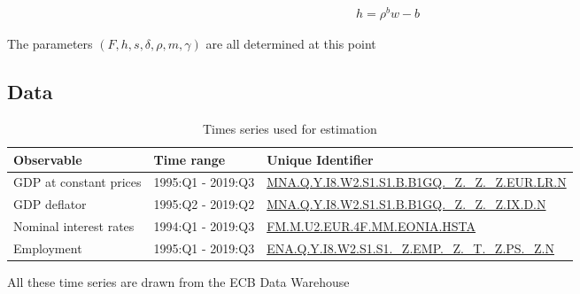 \begin{align*}
h = \rho^b w - b 
\end{align*}

The parameters $\left( F, h, s, \delta, \rho, m, \gamma \right)$ are all determined at this point

\subsection{Data}

\begin{table}[H]
\begin{center}
\begin{tabular}{lll}
\toprule
Observable & Time range & Unique Identifier\\
\midrule
GDP at constant prices & 1995:Q1 - 2019:Q3 & \href{https://sdw.ecb.europa.eu/browseTable.do?node=qview&SERIES_KEY=320.MNA.Q.Y.I8.W2.S1.S1.B.B1GQ._Z._Z._Z.EUR.LR.N&trans=N}{MNA.Q.Y.I8.W2.S1.S1.B.B1GQ.\_Z.\_Z.\_Z.EUR.LR.N}\\
GDP deflator & 1995:Q2 - 2019:Q2 & \href{https://sdw.ecb.europa.eu/quickview.do?SERIES_KEY=320.MNA.Q.Y.I8.W2.S1.S1.B.B1GQ._Z._Z._Z.IX.D.N}{MNA.Q.Y.I8.W2.S1.S1.B.B1GQ.\_Z.\_Z.\_Z.IX.D.N}\\
Nominal interest rates & 1994:Q1 - 2019:Q3 & \href{https://sdw.ecb.europa.eu/quickview.do?SERIES_KEY=143.FM.M.U2.EUR.4F.MM.EONIA.HSTA&start=&end=&submitOptions.x=0&submitOptions.y=0&trans=QF}{FM.M.U2.EUR.4F.MM.EONIA.HSTA}\\
Employment & 1995:Q1 - 2019:Q3 & \href{https://sdw.ecb.europa.eu/browseChart.do?node=qview&SERIES_KEY=390.ENA.Q.Y.I8.W2.S1.S1._Z.EMP._Z._T._Z.PS._Z.N}{ENA.Q.Y.I8.W2.S1.S1.\_Z.EMP.\_Z.\_T.\_Z.PS.\_Z.N}\\
\bottomrule
\end{tabular}
\label{est_series}
\caption{Times series used for estimation}
\end{center}
\begin{flushleft}
\small All these time series are drawn from the ECB Data Warehouse
\end{flushleft}
\end{table}

